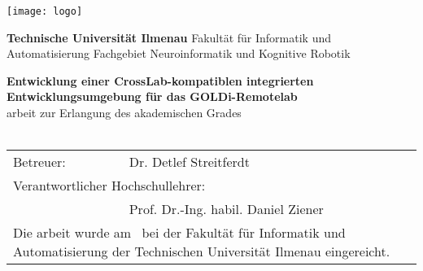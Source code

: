 
\begin{titlepage}
	\hspace{0.2cm}
	\begin{minipage}{3.5cm}
		\texttt{[image: logo]}
	\end{minipage}
	\hspace{0.2cm}
	\begin{minipage}{11cm}
		\vspace{0.7cm}
		\large
		{\bf Technische Universität Ilmenau}\newline
		Fakultät für Informatik und Automatisierung\newline
		Fachgebiet Neuroinformatik und Kognitive Robotik
	\end{minipage}
	\begin{center}
		\vspace{0.8cm}
		{\Large\bfseries Entwicklung einer CrossLab-kompatiblen integrierten Entwicklungsumgebung für das GOLDi-Remotelab\\}
		\vspace{0.8cm}
		\settingsDegree arbeit zur Erlangung des akademischen Grades \settingsDegreeName\\[0.5cm]
		{\Large \bfseries \settingsName\\[1.0cm]}
		\begin{table}[ht]
			\centering
			\begin{tabular}{ll}
				Betreuer: & Dr. Detlef Streitferdt                    \\[2mm]
				\multicolumn{2}{l}{Verantwortlicher Hochschullehrer:} \\
				          & Prof. Dr.-Ing. habil. Daniel Ziener       \\[2cm]
				\multicolumn{2}{p{13cm}}{Die \settingsDegree arbeit wurde am \settingsFinishDate \ bei der Fakultät für Informatik und Automatisierung der Technischen Universität Ilmenau eingereicht.}
			\end{tabular}
		\end{table}
	\end{center}
\end{titlepage}

